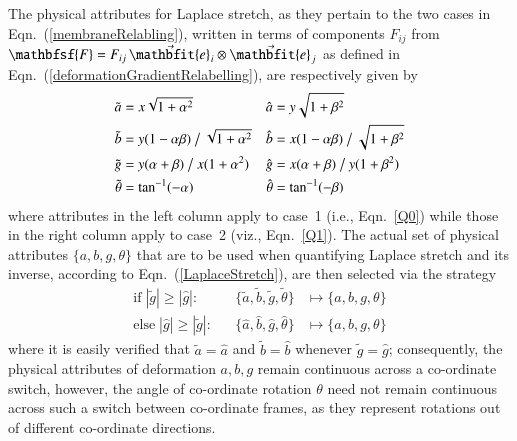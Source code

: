 The physical attributes for Laplace stretch, as they pertain to the two cases in Eqn.~(\ref{membraneRelabling}), written in terms of components $F_{ij}$ from $\mathbfsf{F} = F_{ij} \, \vec{\mathbfit{e}}_{\hspace{0.5pt}i} \otimes \vec{\mathbfit{e}}_{\hspace{0.5pt}j}$ as defined in Eqn.~(\ref{deformationGradientRelabelling}), are respectively given by
\begin{subequations}
	\label{physicalAttributes}
	\begin{align}
	\tilde{a} & = x \sqrt{1 + \alpha^2} & 
	\hat{a} & = y \sqrt{1 + \beta^2} 
	\label{aAttribute} \\
	\tilde{b} & = y ( 1 - \alpha \beta ) \bigm/ \sqrt{1 + \alpha^2} &
	\hat{b} & = x ( 1 - \alpha \beta ) \bigm/ \sqrt{1 + \beta^2} 
	\label{bAttribute} \\ 
	\tilde{g} & = y ( \alpha + \beta ) \bigm/ x (1 + \alpha^2) &
	\hat{g} & = x ( \alpha + \beta ) \bigm/ y (1 + \beta^2)
	\label{gAttribute} \\
	\tilde{\theta} & = \tan^{-1} ( -\alpha ) & 
	\hat{\theta} & = \tan^{-1} ( -\beta )
	\label{thetaAttribute}
	\end{align}
\end{subequations}
where attributes in the left column apply to case~1 (i.e., Eqn.~\ref{Q0}) while those in the right column apply to case~2 (viz., Eqn.~\ref{Q1}).  The actual set of physical attributes $\{ a, b, g, \theta \}$ that are to be used when quantifying Laplace stretch and its inverse, according to Eqn.~(\ref{LaplaceStretch}), are then selected via the strategy  
\begin{subequations}
	\label{attributeMaps}
	\begin{align}
	\mathrm{if} \; | \tilde{g} | \geq | \hat{g} | : & &
	\{ \tilde{a} , \tilde{b} , \tilde{g} , \tilde{\theta} \} &
	\mapsto \{ a , b , g , \theta \}  \\
	\mathrm{else} \; | \hat{g} | \geq | \tilde{g} | : & &
	\{ \hat{a} , \hat{b} , \hat{g} , \hat{\theta} \} & 
	\mapsto \{ a , b , g , \theta \}
	\end{align}
\end{subequations}
where it is easily verified that $\tilde{a} = \hat{a}$ and $\tilde{b} = \hat{b}$ whenever $\tilde{g} = \hat{g}$; consequently, the physical attributes of deformation $a , b , g$ remain continuous across a co-ordinate switch, however, the angle of co-ordinate rotation $\theta$ need not remain continuous across such a switch between co-ordinate frames, as they represent rotations out of different co-ordinate directions.

